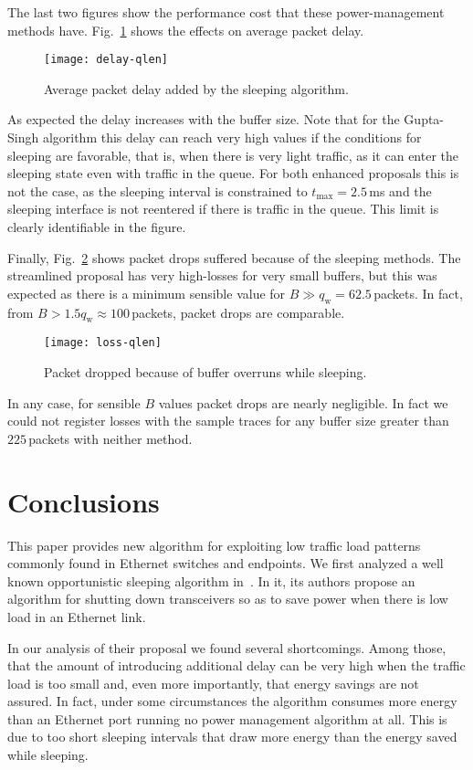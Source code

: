 \documentclass[conference,english]{IEEEtran}
\begin{document}
The last two figures show the performance cost that these power-management
methods have. Fig.~\ref{fig:delay} shows the effects on average packet delay.
\begin{figure}
  \centering
  \texttt{[image: delay-qlen]}
  \caption{Average packet delay added by the sleeping algorithm.}
  \label{fig:delay}
\end{figure}
As expected the delay increases with the buffer size. Note that for the
Gupta-Singh algorithm this delay can reach very high values if the conditions
for sleeping are favorable, that is, when there is very light traffic, as it
can enter the sleeping state even with traffic in the queue. For both enhanced
proposals this is not the case, as the sleeping interval is constrained to
$t_{\max}=2.5\,$ms and the sleeping interface is not reentered if there is
traffic in the queue. This limit is clearly identifiable in the figure.

Finally, Fig.~\ref{fig:drops} shows packet drops suffered because of the
sleeping methods. The streamlined proposal has very high-losses for very small
buffers, but this was expected as there is a minimum sensible value for $B \gg
q_\mathrm w = 62.5\,$packets. In fact, from $B > 1.5 q_\mathrm w \approx
100\,$packets, packet drops are comparable.
\begin{figure}
  \centering
  \texttt{[image: loss-qlen]}
  \caption{Packet dropped because of buffer overruns while sleeping.}
  \label{fig:drops}
\end{figure}
In any case, for sensible $B$ values packet drops are nearly negligible. In
fact we could not register losses with the sample traces for any buffer size
greater than $225\,$packets with neither method.

\section{Conclusions}
\label{sec:conclusions}

This paper provides new algorithm for exploiting low traffic load patterns
commonly found in Ethernet switches and endpoints. We first analyzed a well
known opportunistic sleeping algorithm
in~\cite{gupta07:_using_low_power_modes_for}. In it, its authors propose an
algorithm for shutting down transceivers so as to save power when there is low
load in an Ethernet link.

In our analysis of their proposal we found several shortcomings. Among those,
that the amount of introducing additional delay can be very high when the
traffic load is too small and, even more importantly, that energy savings are
not assured. In fact, under some circumstances the algorithm consumes more
energy than an Ethernet port running no power management algorithm at all.
This is due to too short sleeping intervals that draw more energy than the
energy saved while sleeping.
\end{document}
